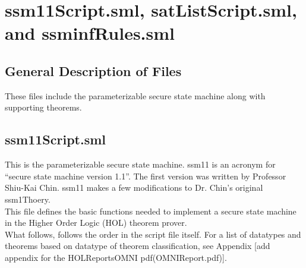 
\section{ssm11Script.sml, satListScript.sml, and ssminfRules.sml}
\label{sec:ssm11scr-satl-ssminf-1}



\subsection{General Description of Files}
\label{sec:gener-descr-files-2}

These files include the parameterizable secure state machine along with supporting theorems.


\subsection{ssm11Script.sml}
\label{sec:ssm11script.sml-1}

This is the parameterizable secure state machine. ssm11 is an acronym for “secure
state machine version 1.1”. The first version was written by Professor Shiu-Kai Chin.
ssm11 makes a few modifications to Dr. Chin’s original ssm1Thoery.\\

This file defines the basic functions needed to implement a secure state machine
in the Higher Order Logic (HOL) theorem prover.\\

What follows, follows the order in the script file itself. For a list of datatypes
and theorems based on datatype of theorem classification, see Appendix [add appendix
for the HOLReportsOMNI pdf(OMNIReport.pdf)].\\

